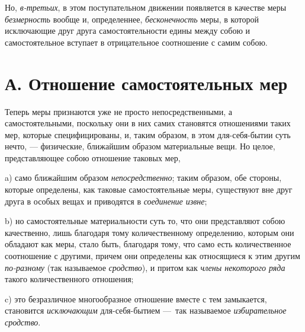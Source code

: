 Но, {\em в-третьих}, в этом поступательном движении
появляется в качестве меры {\em безмерность} вообще и,
определеннее, {\em бесконечность} меры, в которой
исключающие друг друга самостоятельности едины между собою и
самостоятельное вступает в отрицательное соотношение с самим собою.


\section[А. Отношение самостоятельных мер]{А. Отношение самостоятельных мер}

Теперь меры признаются уже не просто
непосредственными, а самостоятельными, поскольку они в них самих становятся
отношениями таких мер, которые специфицированы, и, таким образом, в этом
для-себя-бытии суть нечто, — физические, ближайшим образом материальные
вещи. Но целое, представляющее собою отношение таковых мер,

a) само ближайшим образом {\em непосредственно}; таким
образом, обе стороны, которые определены, как таковые самостоятельные меры,
существуют вне друг друга в особых вещах и приводятся в
{\em соединение извне};

b) но самостоятельные материальности суть то, что они представляют собою
качественно, лишь благодаря тому количественному определению, которым они
обладают как меры, стало быть, благодаря тому, что само есть количественное
соотношение с другими, причем они определены как относящиеся к этим другим
{\em по-разному} (так называемое
{\em сродство}), и притом как
{\em члены некоторого ряда} такого количественного
отношения;

c) это безразличное многообразное отношение вместе с тем замыкается,
становится {\em исключающим} для-себя-бытием —~так
называемое {\em избирательное сродство}.

